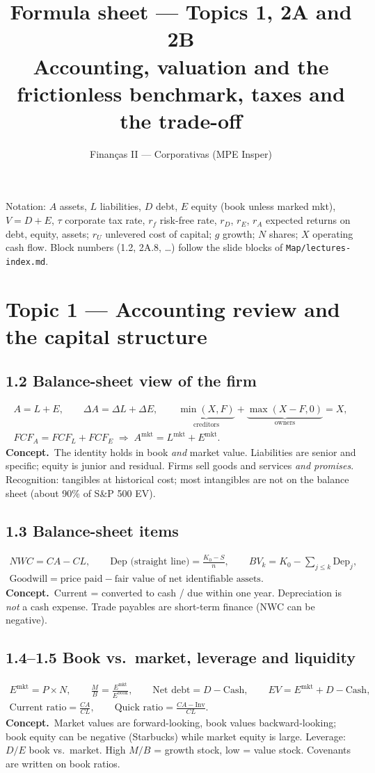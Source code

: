 \documentclass[10pt,a4paper]{article}
\title{Formula sheet --- Topics 1, 2A and 2B\\[2pt]
\large Accounting, valuation and the frictionless benchmark, taxes and the trade-off}
\author{Finan\c{c}as II --- Corporativas (MPE Insper)}
\date{}
\newcommand{\blk}[1]{\subsection*{\color{blue!55!black}#1}}
\newcommand{\idea}{\textbf{Concept.}~}
\begin{document}
\maketitle
\vspace{-1.5em}
\noindent Notation: $A$ assets, $L$ liabilities, $D$ debt, $E$ equity (book unless marked mkt), $V=D+E$,
$\tau$ corporate tax rate, $r_f$ risk-free rate, $r_D$, $r_E$, $r_A$ expected returns on debt,
equity, assets; $r_U$ unlevered cost of capital; $g$ growth; $N$ shares; $X$ operating cash flow.
Block numbers (1.2, 2A.8, \dots) follow the slide blocks of \texttt{Map/lectures-index.md}.

\section*{Topic 1 --- Accounting review and the capital structure}

\blk{1.2 Balance-sheet view of the firm}
\begin{gather*}
A = L + E,\qquad \Delta A=\Delta L+\Delta E,\qquad
\underbrace{\min(X,F)}_{\text{creditors}}+\underbrace{\max(X-F,0)}_{\text{owners}} = X,\\
FCF_A = FCF_L + FCF_E \;\Rightarrow\; A^{\text{mkt}} = L^{\text{mkt}} + E^{\text{mkt}}.
\end{gather*}
\idea The identity holds in book \emph{and} market value. Liabilities are senior and specific;
equity is junior and residual. Firms sell goods and services \emph{and promises}. Recognition:
tangibles at historical cost; most intangibles are not on the balance sheet (about 90\% of S\&P 500
EV).

\blk{1.3 Balance-sheet items}
\begin{gather*}
NWC = CA - CL,\qquad \text{Dep (straight line)}=\frac{K_0-S}{n},\qquad
BV_k = K_0-\sum_{j\le k}\text{Dep}_j,\\
\text{Goodwill}=\text{price paid}-\text{fair value of net identifiable assets}.
\end{gather*}
\idea Current = converted to cash / due within one year. Depreciation is \emph{not} a cash expense.
Trade payables are short-term finance (NWC can be negative).

\blk{1.4--1.5 Book vs.\ market, leverage and liquidity}
\begin{gather*}
E^{\text{mkt}} = P\times N,\qquad \frac{M}{B}=\frac{E^{\text{mkt}}}{E^{\text{book}}},\qquad
\text{Net debt}=D-\text{Cash},\qquad EV = E^{\text{mkt}}+D-\text{Cash},\\
\text{Current ratio}=\frac{CA}{CL},\qquad \text{Quick ratio}=\frac{CA-\text{Inv}}{CL}.
\end{gather*}
\idea Market values are forward-looking, book values backward-looking; book equity can be negative
(Starbucks) while market equity is large. Leverage: $D/E$ book vs.\ market. High $M/B$ = growth
stock, low = value stock. Covenants are written on book ratios.
\end{document}
